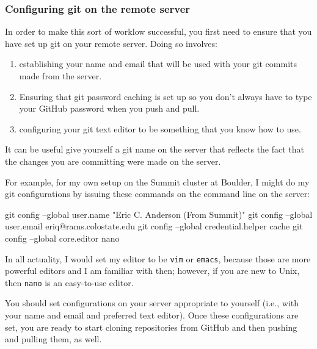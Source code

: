 \documentclass[]{krantz}
\makeatletter
\newenvironment{Shaded}{\begin{snugshade}}{\end{snugshade}}
\newcommand{\FunctionTok}[1]{\textcolor[rgb]{0,0,0}{#1}}
\newcommand{\NormalTok}[1]{#1}
\newcommand{\StringTok}[1]{\textcolor[rgb]{0.5,0.5,0.5}{#1}}
\providecommand{\tightlist}{%
  \setlength{\itemsep}{0pt}\setlength{\parskip}{0pt}}
\newenvironment{kframe}{%
\medskip{}
\setlength{\fboxsep}{.8em}
 \def\at@end@of@kframe{}%
 \ifinner\ifhmode%
  \def\at@end@of@kframe{\end{minipage}}%
  \begin{minipage}{\columnwidth}%
 \fi\fi%
 \def\FrameCommand##1{\hskip\@totalleftmargin \hskip-\fboxsep
 \colorbox{shadecolor}{##1}\hskip-\fboxsep
     \hskip-\linewidth \hskip-\@totalleftmargin \hskip\columnwidth}%
 \MakeFramed {\advance\hsize-\width
   \@totalleftmargin\z@ \linewidth\hsize
   \@setminipage}}%
 {\par\unskip\endMakeFramed%
 \at@end@of@kframe}
\renewenvironment{Shaded}{\begin{kframe}}{\end{kframe}}
\makeatother
\begin{document}
\hypertarget{configuring-git-on-the-remote-server}{%
\subsubsection{Configuring git on the remote server}\label{configuring-git-on-the-remote-server}}

In order to make this sort of worklow successful, you first need
to ensure that you have set up git on your remote server. Doing
so involves:

\begin{enumerate}
\def\labelenumi{\arabic{enumi}.}
\tightlist
\item
  establishing your name and email that will be used with your git commits
  made from the server.
\item
  Ensuring that git password caching is set up so you don't always have
  to type your GitHub password when you push and pull.
\item
  configuring your git text editor to be something that you know how
  to use.
\end{enumerate}

It can be useful give yourself a git name on the server that reflects
the fact that the changes you are committing were made on the server.

For example, for my own setup on the Summit cluster at Boulder, I might
do my git configurations by issuing these commands on the
command line on the server:

\begin{Shaded}
\begin{Highlighting}[]
\FunctionTok{git}\NormalTok{ config --global user.name }\StringTok{"Eric C. Anderson (From Summit)"}
\FunctionTok{git}\NormalTok{ config --global user.email eriq@rams.colostate.edu}
\FunctionTok{git}\NormalTok{ config --global credential.helper cache}
\FunctionTok{git}\NormalTok{ config --global core.editor nano}
\end{Highlighting}
\end{Shaded}

In all actuality, I would set my editor to be \texttt{vim} or \texttt{emacs}, because those are
more powerful editors and I am familiar with then; however, if you are new to Unix,
then \texttt{nano} is an easy-to-use editor.

You should set configurations on your server appropriate to yourself
(i.e., with your name and email and preferred text editor). Once these configurations are set, you are ready to start cloning
repositories from GitHub and then pushing and pulling them, as well.
\end{document}
